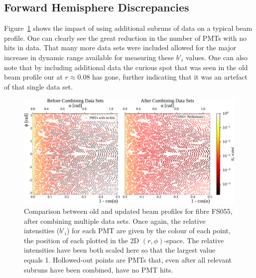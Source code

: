\subsection{Forward Hemisphere Discrepancies}\label{sec:smellie_systematics_forward}
Figure~\ref{fig:updated_beam_profile} shows the impact of using additional subruns of data on a typical beam profile. One can clearly see the great reduction in the number of PMTs with no hits in data. That many more data sets were included allowed for the major increase in dynamic range available for measuring these $b'_{i}$ values. One can also note that by including additional data the curious spot that was seen in the old beam profile our at $r\approx0.08$ has gone, further indicating that it was an artefact of that single data set.
\begin{figure}
    \centering
    \includegraphics[width=\textwidth]{4_SMELLIESimulation/images/flat_plot_r_comparison_FS055_old_vs_new_empty_circles.pdf}
    \caption[Comparison between old and updated beam profiles for fibre FS055, after combining multiple data sets]{Comparison between old and updated beam profiles for fibre FS055, after combining multiple data sets. Once again, the relative intensities ($b'_{i}$) for each PMT are given by the colour of each point, the position of each plotted in the 2D $(r,\phi)$-space. The relative intensities have been both scaled here so that the largest value equals 1. Hollowed-out points are PMTs that, even after all relevant subruns have been combined, have no PMT hits.}
    \label{fig:updated_beam_profile}
\end{figure}

